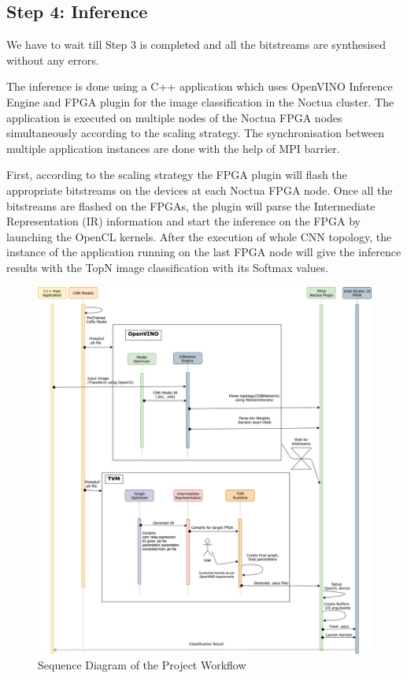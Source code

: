 \subsection*{Step 4: Inference}
We have to wait till Step 3 is completed and all the bitstreams are synthesised without any errors.

The inference is done using a C++ application which uses OpenVINO Inference Engine and FPGA plugin  for the image classification in the Noctua cluster. The application is executed on multiple nodes of the Noctua FPGA nodes simultaneously according to the scaling strategy. The synchronisation between multiple application instances are done with the help of MPI barrier.

First, according to the scaling strategy the FPGA plugin will flash the appropriate bitstreams on the devices at each Noctua FPGA node. Once all the bitstreams are flashed on the FPGAs, the plugin will parse the Intermediate Representation (IR) information and start the inference on the FPGA by launching the OpenCL kernels.
After the execution of whole CNN topology, the instance of the application running on the last FPGA node will give the inference results with the TopN image classification with its Softmax values.



\begin{figure}[!htbp]
   \includegraphics[width=\textwidth,height=\textheight]{img/udd.png}
   \caption{Sequence Diagram of the Project Workflow}
\end{figure}
